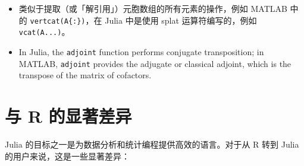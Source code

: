 \begin{itemize}
\item 类似于提取（或「解引用」）元胞数组的所有元素的操作，例如 MATLAB 中的 \texttt{vertcat(A\{:\})}，在 Julia 中是使用 splat 运算符编写的，例如 \texttt{vcat(A...)}。


\item In Julia, the \texttt{adjoint} function performs conjugate transposition; in MATLAB, \texttt{adjoint} provides the {\textquotedbl}adjugate{\textquotedbl} or classical adjoint, which is the transpose of the matrix of cofactors.

\end{itemize}


\hypertarget{8033006673941157229}{}


\section{与 R 的显著差异}



Julia 的目标之一是为数据分析和统计编程提供高效的语言。对于从 R 转到 Julia 的用户来说，这是一些显著差异：



